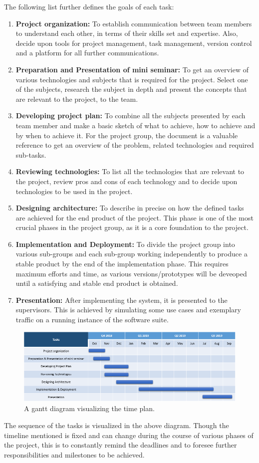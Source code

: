 The following list further defines the goals of each task: 
\begin{enumerate}
	\item \textbf{Project organization:}
	To establish communication between team members to understand each other, in terms of their skills set and expertise. Also, decide upon tools for project management, task management, version control and a platform for all further communications.
	\item \textbf{Preparation and Presentation of mini seminar:}
	To get an overview of various technologies and subjects that is required for the project. Select one of the subjects, research the subject in depth and present the concepts that are relevant to the project, to the team.
	\item \textbf{Developing project plan:}
	To combine all the subjects presented by each team member and make a basic sketch of what to achieve, how to achieve and by when to achieve it. For the project group, the document is a valuable reference to get an overview of the problem, related technologies and required sub-tasks. 
	\item \textbf{Reviewing technologies:}
	To list all the technologies that are relevant to the project, review pros and cons of each technology and to decide upon technologies to be used in the project.
	\item \textbf{Designing architecture:}
	To describe in precise on how the defined tasks are achieved for the end product of the project. This phase is one of the most crucial phases in the project group, as it is a core foundation to the project.
	\item \textbf{Implementation and Deployment:}
	To divide the project group into various sub-groups and each sub-group working independently to produce a stable product by the end of the implementation phase. This requires maximum efforts and time, as various versions/prototypes will be deveoped until a satisfying and stable end product is obtained. 
	\item \textbf{Presentation:}
	After implementing the system, it is presented to the supervisors. This is achieved by simulating some use cases and exemplary traffic on a running instance of the software suite.
	\end{enumerate}

\begin{figure}[h]
\centering
\includegraphics[scale=.6]{timeplan}
\caption{A gantt diagram visualizing the time plan.}
\end{figure}
The sequence of the tasks is visualized in the above diagram. Though the timeline mentioned is fixed and can change during the course of various phases of the project, this is to constantly remind the deadlines and to foresee further responsibilities and milestones to be achieved. 


	